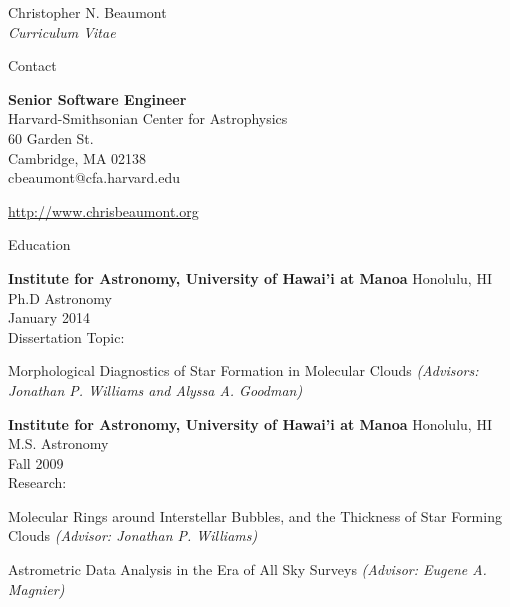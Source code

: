 \documentclass[10pt]{article}
\newenvironment{sublist}{%
	\begin{list}{}{%
		\setlength{\itemsep}{0em}\setlength{\parsep}{0em}%
		\setlength{\topsep}{0em}\setlength{\parskip}{0em}%
	}%
}%
{ \end{list} }
\begin{document}
\date{}


\newlength{\oldcvlabelwidth}
\renewcommand*{\cvbibname}{}

\begin{cv}{Christopher N. Beaumont\\{\large \itshape Curriculum Vitae}}

\begin{cvlist}{Contact}
	\item
	\textbf{Senior Software Engineer} \\
	Harvard-Smithsonian Center for Astrophysics \\
	60 Garden St.\\
	Cambridge, MA 02138\\
	cbeaumont@cfa.harvard.edu

	\item \href{http://www.chrisbeaumont.org}{http://www.chrisbeaumont.org}
	
\end{cvlist}

\begin{cvlist}{Education}
	\item \textbf{Institute for Astronomy, University of Hawai'i at Manoa} Honolulu, HI \\
		Ph.D Astronomy \\
		January 2014 \\
		Dissertation Topic: 
		\begin{sublist}
		\item Morphological Diagnostics of Star Formation in Molecular Clouds \emph{(Advisors: Jonathan P. Williams and Alyssa A. Goodman)}
		\end{sublist}
	\item \textbf{Institute for Astronomy, University of Hawai'i at Manoa} Honolulu, HI\\
		M.S. Astronomy\\
		Fall 2009\\
		Research:
		\begin{sublist}
		\item Molecular Rings around Interstellar Bubbles, and the Thickness of Star Forming Clouds \emph{(Advisor: Jonathan P. Williams)}
		\item Astrometric Data Analysis in the Era of All Sky Surveys \emph{(Advisor: Eugene A. Magnier)}
		\end{sublist}
		

\end{cvlist}
\end{cv}
\end{document}
